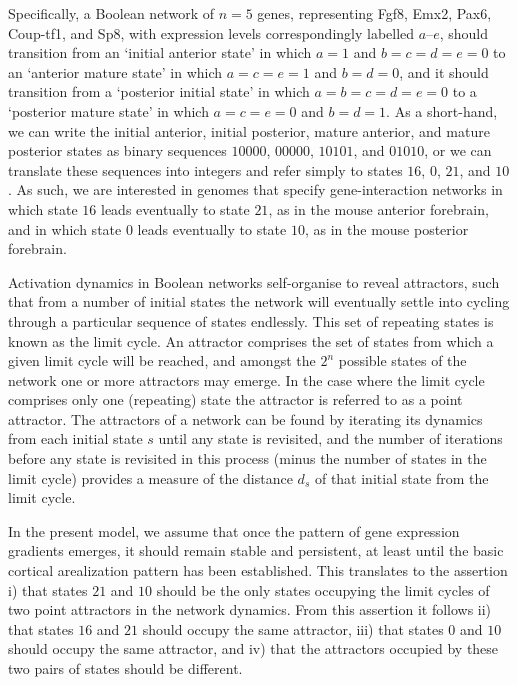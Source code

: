 \documentclass[10pt,letterpaper]{article}
\begin{document}
Specifically, a Boolean network of $n=5$ genes, representing Fgf8, Emx2, Pax6, Coup-tf1, and Sp8, with expression levels correspondingly labelled $a$--$e$, should transition from an `initial anterior state' in which $a=1$ and $b=c=d=e=0$ to an `anterior mature state' in which $a=c=e=1$ and $b=d=0$, and it should transition from a `posterior initial state' in which $a=b=c=d=e=0$ to a `posterior mature state' in which $a=c=e=0$ and $b=d=1$. As a short-hand, we can write the initial anterior, initial posterior, mature anterior, and mature posterior states as binary sequences $10000$, $00000$, $10101$, and $01010$, or we can translate these sequences into integers
 and refer simply to states $16$, $0$, $21$, and $10$. As such, we are interested in genomes that specify gene-interaction networks in which state $16$ leads eventually to state $21$, as in the mouse anterior forebrain, and in which state $0$ leads eventually to state $10$, as in the mouse posterior forebrain.

Activation dynamics in Boolean networks self-organise to reveal attractors, such that from a number of initial states the network will eventually settle into cycling through a particular sequence of states endlessly. This set of repeating states is known as the limit cycle. An attractor comprises the set of states from which a given limit cycle will be reached, and amongst the $2^n$ possible states of the network one or more attractors may emerge. In the case where the limit cycle comprises only one (repeating) state the attractor is referred to as a point attractor. The attractors of a network can be found by iterating its dynamics from each initial state $s$ until any state is revisited, and the number of iterations before any state is revisited in this process (minus the number of states in the limit cycle) provides a measure of the distance $d_s$ of that initial state from the limit cycle.
 
In the present model, we assume that once the pattern of gene expression gradients emerges, it should remain stable and persistent, at least until the basic cortical arealization pattern has been established. This translates to the assertion i) that states $21$ and $10$ should be the only states occupying the limit cycles of two point attractors in the network dynamics. From this assertion it follows ii) that states $16$ and $21$ should occupy the same attractor, iii) that states $0$ and $10$ should occupy the same attractor, and iv) that the attractors occupied by these two pairs of states should be different. 
\end{document}

